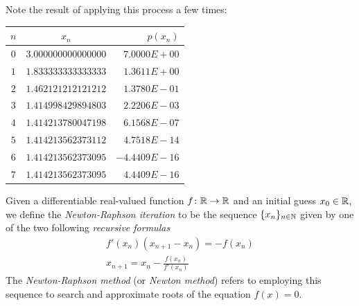 Note the result of applying this process a few times:
\begin{center}\label{table:Newton-Raphson}
\begin{tabular}{|c|c|r|} \hline 
$n$ & $x_n$ & $p(x_n)$ \\ \hline \hline 
$0$ & $3.000000000000000$ & $7.0000E+00$ \\ \hline 
$1$ & $1.833333333333333$ & $1.3611E+00$ \\ \hline 
$2$ & $1.462121212121212$ & $1.3780E-01$ \\ \hline 
$3$ & $1.414998429894803$ & $2.2206E-03$ \\ \hline 
$4$ & $1.414213780047198$ & $6.1568E-07$ \\ \hline 
$5$ & $1.414213562373112$ & $4.7518E-14$ \\ \hline 
$6$ & $1.414213562373095$ & $-4.4409E-16$ \\ \hline 
$7$ & $1.414213562373095$ & $4.4409E-16$ \\ \hline 
\end{tabular}
\end{center}

\begin{definition}
Given a differentiable real-valued function $f\colon \mathbb{R} \to \mathbb{R}$ and an initial guess $x_0 \in \mathbb{R}$, we define the \emph{Newton-Raphson iteration} to be the sequence $\{ x_n \}_{n \in \mathbb{N}}$ given by one of the two following \emph{recursive formulas}
\begin{equation}\label{equation:NewtonRaphson1dim}
\begin{split}
f'(x_n) (x_{n+1}-x_n) = -f(x_n) \\
x_{n+1} = x_n - \frac{f(x_n)}{f'(x_n)}
\end{split}
\end{equation}
The \emph{Newton-Raphson method} (or \emph{Newton method}) refers to employing this sequence to search and approximate roots of the equation $f(x) = 0$.
\end{definition}

